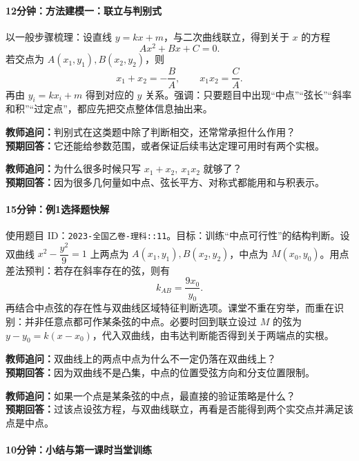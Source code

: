 \documentclass[UTF8,a4paper,11pt]{ctexart}
\begin{document}
\paragraph{12分钟：方法建模一：联立与判别式}

以一般步骤梳理：设直线 $y=kx+m$，与二次曲线联立，得到关于 $x$ 的方程\[Ax^2+Bx+C=0.\] 若交点为 $A(x_1,y_1),B(x_2,y_2)$，则\[x_1+x_2=-\frac{B}{A},\qquad x_1x_2=\frac{C}{A}.\] 再由 $y_i=kx_i+m$ 得到对应的 $y$ 关系。强调：只要题目中出现“中点”“弦长”“斜率和积”“过定点”，都应先把交点整体信息抽出来。

\noindent\textbf{教师追问：}判别式在这类题中除了判断相交，还常常承担什么作用？\\

\textbf{预期回答：}它还能给参数范围，或者保证后续韦达定理可用时有两个实根。\par

\noindent\textbf{教师追问：}为什么很多时候只写 $x_1+x_2,\ x_1x_2$ 就够了？\\

\textbf{预期回答：}因为很多几何量如中点、弦长平方、对称式都能用和与积表示。\par

\paragraph{15分钟：例1选择题快解}

使用题目 ID：\texttt{2023-全国乙卷-理科::11}。目标：训练“中点可行性”的结构判断。设双曲线 $x^2-\dfrac{y^2}{9}=1$ 上两点为 $A(x_1,y_1),B(x_2,y_2)$，中点为 $M(x_0,y_0)$。用点差法预判：若存在斜率存在的弦，则有\[k_{AB}=\frac{9x_0}{y_0}.\] 再结合中点弦的存在性与双曲线区域特征判断选项。课堂不重在穷举，而重在识别：并非任意点都可作某条弦的中点。必要时回到联立设过 $M$ 的弦为 $y-y_0=k(x-x_0)$，代入双曲线，由韦达判断能否得到关于两端点的实根。

\noindent\textbf{教师追问：}双曲线上的两点中点为什么不一定仍落在双曲线上？\\

\textbf{预期回答：}因为双曲线不是凸集，中点的位置受弦方向和分支位置限制。\par

\noindent\textbf{教师追问：}如果一个点是某条弦的中点，最直接的验证策略是什么？\\

\textbf{预期回答：}过该点设弦方程，与双曲线联立，再看是否能得到两个实交点并满足该点是中点。\par

\paragraph{10分钟：小结与第一课时当堂训练}
\end{document}
